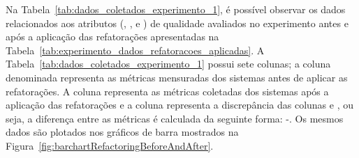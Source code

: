Na Tabela~\ref{tab:dados_coletados_experimento_1}, é possível observar os dados relacionados aos atributos (, ,  e ) de qualidade avaliados no experimento antes e após a aplicação das refatorações apresentadas na Tabela~\ref{tab:experimento_dados_refatoracoes_aplicadas}. A Tabela~\ref{tab:dados_coletados_experimento_1} possui sete colunas; a coluna denominada  representa as métricas mensuradas dos sistemas antes de aplicar as refatorações. A coluna  representa as métricas coletadas dos sistemas após a aplicação das refatorações e a coluna  representa a discrepância das colunas  e , ou seja, a diferença entre as métricas é calculada da seguinte forma: -. Os mesmos dados são plotados nos gráficos de barra mostrados na Figura~\ref{fig:barchartRefactoringBeforeAndAfter}. 


